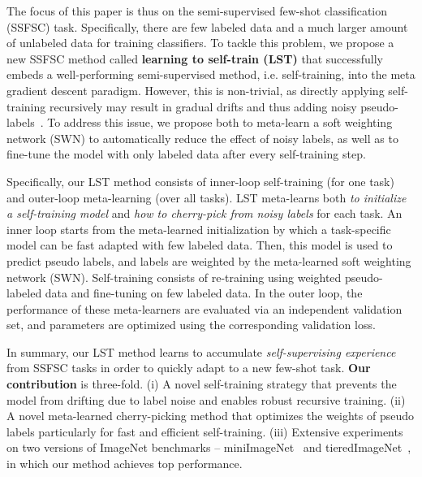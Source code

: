 \documentclass{article}
\begin{document}
The focus of this paper is thus on the semi-supervised few-shot classification (SSFSC) task. Specifically, there are few labeled data and a much larger amount of unlabeled data for training classifiers.
To tackle this problem, we propose a new SSFSC method called \textbf{learning to self-train (LST)} that successfully embeds a well-performing semi-supervised method, i.e. self-training, into the meta gradient descent paradigm.
However, this is non-trivial, as directly applying self-training recursively may result in gradual drifts 
and thus adding noisy pseudo-labels~\cite{ZhangICLR2017noisy}.
To address this issue, we propose both to meta-learn
a soft weighting network (SWN) to automatically reduce the effect of noisy labels, as well as to fine-tune the model with only labeled data after every self-training step. 




Specifically, our LST method consists of inner-loop self-training (for one task) and outer-loop meta-learning (over all tasks). LST meta-learns both \emph{to initialize a self-training model} and \emph{how to cherry-pick from noisy labels} for each task. 
An inner loop starts from the meta-learned initialization by which a task-specific model can be fast adapted with few labeled data. Then, this model is used to predict pseudo labels, and labels are weighted by the meta-learned soft weighting network (SWN).
Self-training consists of re-training using weighted pseudo-labeled data and fine-tuning on few labeled data.
In the outer loop, the performance of these meta-learners are evaluated via an independent validation set,
and  parameters are optimized using the corresponding validation loss.


In summary, our LST method learns to accumulate \emph{self-supervising experience} from SSFSC tasks in order to quickly adapt to a new few-shot task.
\textbf{Our contribution} is three-fold. 
(i) A novel self-training strategy 
that prevents the model from drifting due to label noise and enables robust recursive training.
(ii) A novel meta-learned cherry-picking method that optimizes the weights of pseudo labels particularly for fast and efficient self-training.
(iii) Extensive experiments on two versions of ImageNet benchmarks -- miniImageNet~\cite{VinyalsBLKW16} and tieredImageNet~\cite{RenICLR2018_semisupervised}, in which our method achieves top performance.
\end{document}
